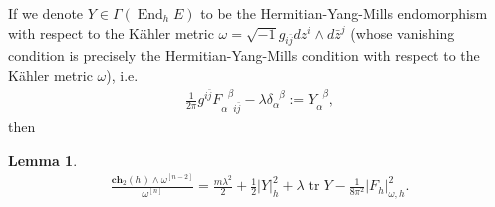 \documentclass[10pt, letterpaper]{amsart}
\newcommand{\tr}{\operatorname{tr}}
\newcommand{\End}{\operatorname{End}}
\theoremstyle{plain}
\newtheorem{lemma}[theorem]{Lemma}
\theoremstyle{definition}
\numberwithin{equation}{section}
\begin{document}
If we denote $Y\in \Gamma\left(\End_h E\right)$ to be the Hermitian-Yang-Mills endomorphism with respect to the K\"ahler metric $\omega=\sqrt{-1}g_{i\bar j}dz^i\wedge d\bar z^j$ (whose vanishing condition is precisely the Hermitian-Yang-Mills condition with respect to the K\"ahler metric $\omega$), i.e. 
\begin{align*}
   \frac{1}{2\pi} g^{i\bar j}F_{\alpha\phantom{\beta}i\bar j}^{\phantom{\alpha}\beta}
 - \lambda \delta_\alpha^{\phantom{\alpha}\beta} 
 := 
 Y_{\alpha\phantom{\beta}}^{\phantom{\alpha}\beta},
 \end{align*}
 then
\begin{lemma}
\label{lemma-HYM}
\begin{align*}
    \frac{\mathbf{ch}_2\left(h\right)\wedge \omega^{[n-2]}}{\omega^{[n]}}
    = 
    \frac{m\lambda^2}{2}
    + 
    \frac{1}{2}\left|Y\right|_h^2 
    + 
    \lambda \tr Y
    - 
    \frac{1}{8\pi^2}\left|F_h\right|_{\omega, h}^2.
  \end{align*}  
\end{lemma}
\end{document}

